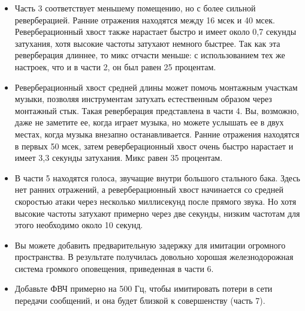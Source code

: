 \documentclass{beamer}
\begin{document}
\begin{frame}          
  \begin{itemize}
    \item Часть 3 соответствует меньшему помещению, но с более сильной реверберацией. Ранние отражения находятся между 16 мсек и 40 мсек. Реверберационный хвост также нарастает быстро и имеет около 0,7 секунды затухания, хотя высокие частоты затухают немного быстрее. Так как эта реверберация длиннее, то микс отчасти меньше: с использованием тех же настроек, что и в части 2, он был равен 25 процентам.
    \item Реверберационный хвост средней длины может помочь монтажным участкам музыки, позволяя инструментам затухать естественным образом через монтажный стык. Такая реверберация представлена в части 4. Вы, возможно, даже не заметите ее, когда играет музыка, но можете услышать ее в двух местах, когда музыка внезапно останавливается. Ранние отражения находятся в первых 50 мсек, затем реверберационный хвост очень быстро нарастает и имеет 3,3 секунды затухания. Микс равен 35 процентам.
  \end{itemize}
\end{frame}  

\begin{frame}
  \begin{itemize}
    \item В части 5 находятся голоса, звучащие внутри большого стального бака. Здесь нет ранних отражений, а реверберационный хвост начинается со средней скоростью атаки через несколько миллисекунд после прямого звука. Но хотя высокие частоты затухают примерно через две секунды, низким частотам для этого необходимо около 10 секунд.
    \item Вы можете добавить предварительную задержку для имитации огромного пространства. В результате получилась довольно хорошая железнодорожная система громкого оповещения, приведенная в части 6.
    \item Добавьте ФВЧ примерно на 500 Гц, чтобы имитировать потери в сети передачи сообщений, и она будет близкой к совершенству (часть 7).
  \end{itemize}
\end{frame}  
\end{document}
